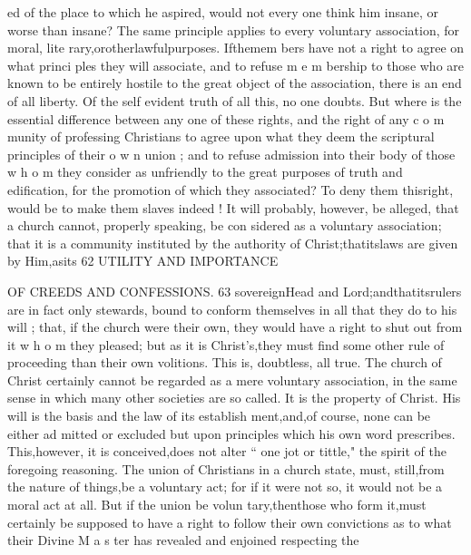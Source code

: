 \documentclass[
]{book}
\begin{document}
ed of the place to which he aspired, would not every one think him insane, or worse than insane? The same principle applies to
every voluntary association, for moral, lite rary,orotherlawfulpurposes. Ifthemem
bers have not a right to agree on what princi ples they will associate, and to refuse m e m bership to those who are known to be entirely
hostile to the great object of the association, there is an end of all liberty. Of the self evident truth of all this, no one doubts. But where is the essential difference between any one of these rights, and the right of any c o m munity of professing Christians to agree upon what they deem the scriptural principles of their o w n union ; and to refuse admission into
their body of those w h o m they consider as unfriendly to the great purposes of truth and edification, for the promotion of which they associated? To deny them thisright, would be to make them slaves indeed !
It will probably, however, be alleged, that a church cannot, properly speaking, be con sidered as a voluntary association; that it is a community instituted by the authority of Christ;thatitslaws are given by Him,asits
62
UTILITY AND IMPORTANCE

OF CREEDS AND CONFESSIONS. 63
sovereignHead and Lord;andthatitsrulers
are in fact only stewards, bound to conform
themselves in all that they do to his will ; that,
if the church were their own, they would
have a right to shut out from it w h o m they
pleased; but as it is Christ's,they must find
some other rule of proceeding than their own
volitions. This is, doubtless, all true. The church of Christ certainly cannot be regarded
as a mere voluntary association, in the same
sense in which many other societies are so called. It is the property of Christ. His
will is the basis and the law of its establish
ment,and,of course, none can be either ad
mitted or excluded but upon principles which
his own word prescribes. This,however, it
is conceived,does not alter `` one jot or tittle,"
the spirit of the foregoing reasoning. The union of Christians in a church state, must,
still,from the nature of things,be a voluntary act; for if it were not so, it would not be a moral act at all. But if the union be volun tary,thenthose who form it,must certainly be supposed to have a right to follow their own convictions as to what their Divine M a s ter has revealed and enjoined respecting the
\end{document}
